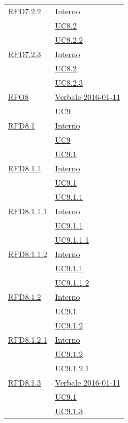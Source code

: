 \begin{longtable}{|>{\centering}m{5cm}|m{5cm}<{\centering}|}
\hyperlink{RFD7.2.2}{RFD7.2.2} & \hyperlink{Interno}{Interno}\\
& \hyperref[UC8.2]{UC8.2}\\
& \hyperref[UC8.2.2]{UC8.2.2}\\ \hline

\hyperlink{RFD7.2.3}{RFD7.2.3} & \hyperlink{Interno}{Interno}\\
& \hyperref[UC8.2]{UC8.2}\\
& \hyperref[UC8.2.3]{UC8.2.3}\\ \hline

\hyperlink{RFO8}{RFO8} & \hyperlink{Verbale 2016-01-11}{Verbale 2016-01-11}\\
& \hyperref[UC9]{UC9}\\ \hline

\hyperlink{RFD8.1}{RFD8.1} & \hyperlink{Interno}{Interno}\\
& \hyperref[UC9]{UC9}\\
& \hyperref[UC9.1]{UC9.1}\\ \hline

\hyperlink{RFD8.1.1}{RFD8.1.1} & \hyperlink{Interno}{Interno}\\
& \hyperref[UC9.1]{UC9.1}\\
& \hyperref[UC9.1.1]{UC9.1.1}\\ \hline

\hyperlink{RFD8.1.1.1}{RFD8.1.1.1} & \hyperlink{Interno}{Interno}\\
& \hyperref[UC9.1.1]{UC9.1.1}\\
& \hyperref[UC9.1.1.1]{UC9.1.1.1}\\ \hline

\hyperlink{RFD8.1.1.2}{RFD8.1.1.2} & \hyperlink{Interno}{Interno}\\
& \hyperref[UC9.1.1]{UC9.1.1}\\
& \hyperref[UC9.1.1.2]{UC9.1.1.2}\\ \hline

\hyperlink{RFD8.1.2}{RFD8.1.2} & \hyperlink{Interno}{Interno}\\
& \hyperref[UC9.1]{UC9.1}\\
& \hyperref[UC9.1.2]{UC9.1.2}\\ \hline

\hyperlink{RFD8.1.2.1}{RFD8.1.2.1} & \hyperlink{Interno}{Interno}\\
& \hyperref[UC9.1.2]{UC9.1.2}\\
& \hyperref[UC9.1.2.1]{UC9.1.2.1}\\ \hline

\hyperlink{RFD8.1.3}{RFD8.1.3} & \hyperlink{Verbale 2016-01-11}{Verbale 2016-01-11}\\
& \hyperref[UC9.1]{UC9.1}\\
& \hyperref[UC9.1.3]{UC9.1.3}\\ \hline


\end{longtable}
